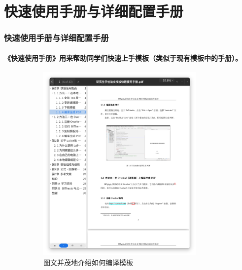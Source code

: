 \documentclass[
  aspectratio=169,
  presentation,
  titlegraphic=./images/bit.png,
  framelogo=./images/bit.png
]{bitbeamer}
\begin{document}
\section{快速使用手册与详细配置手册}    %

\begin{frame}
\frametitle{快速使用手册与详细配置手册}
\framesubtitle{《快速使用手册》用来帮助同学们快速上手模板（类似于现有模板中的手册）。}

  \vspace{-5ex}
  
  \begin{figure}
    \begin{subfigure}{0.40\textwidth}
      \includegraphics[width=0.9\textwidth]{images/9-1.png}
      \caption{图文并茂地介绍如何编译模板}
    \end{subfigure}
    \begin{subfigure}{0.40\textwidth}

\end{subfigure}
\end{figure}
\end{frame}
\end{document}
